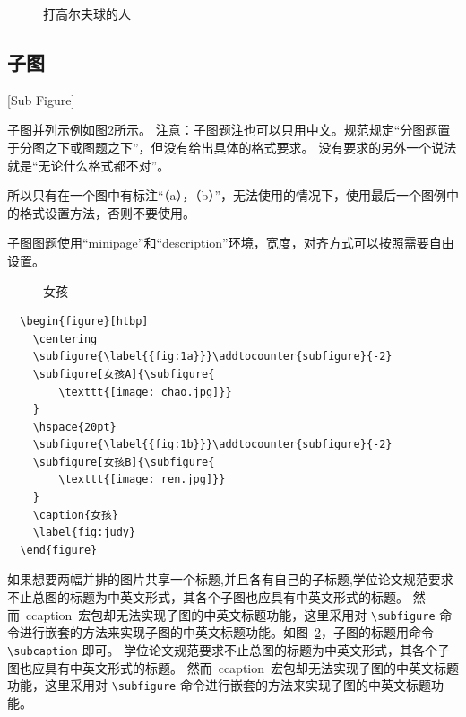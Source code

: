 \begin{figure}[htbp]
\begin{minipage}[t]{0.4\textwidth}
    \caption{打高尔夫球的人}
    \label{golfer6}
  \end{minipage}
\end{figure}

\subsection{子图}[Sub Figure]

子图并列示例如图\ref{fig:judy}所示。
注意：子图题注也可以只用中文。规范规定“分图题置于分图之下或图题之下”，但没有给出具体的格式要求。
没有要求的另外一个说法就是“无论什么格式都不对”。

所以只有在一个图中有标注“（a），（b）”，无法使用的情况下，使用最后一个图例中的格式设置方法，否则不要使用。

子图图题使用“minipage”和“description”环境，宽度，对齐方式可以按照需要自由设置。

\begin{figure}[htbp]
  \centering
  \addtocounter{subfigure}{-2}
  \hspace{20pt}
  \addtocounter{subfigure}{-2}
  \caption{女孩}
  \label{fig:judy}
\end{figure}

\begin{lstlisting}
  \begin{figure}[htbp]
    \centering
    \subfigure{\label{{fig:1a}}}\addtocounter{subfigure}{-2}
    \subfigure[女孩A]{\subfigure{
        \texttt{[image: chao.jpg]}}
    }
    \hspace{20pt}
    \subfigure{\label{{fig:1b}}}\addtocounter{subfigure}{-2}
    \subfigure[女孩B]{\subfigure{
        \texttt{[image: ren.jpg]}}
    }
    \caption{女孩}
    \label{fig:judy}
  \end{figure}
\end{lstlisting}


如果想要两幅并排的图片共享一个标题,并且各有自己的子标题,学位论文规范要求不止总图的标题为中英文形式，其各个子图也应具有中英文形式的标题。
然而~ccaption~宏包却无法实现子图的中英文标题功能，这里采用对 \verb|\subfigure| 命令进行嵌套的方法来实现子图的中英文标题功能。如图~\ref{fig:judy}，子图的标题用命令 \verb|\subcaption| 即可。
学位论文规范要求不止总图的标题为中英文形式，其各个子图也应具有中英文形式的标题。
然而~ccaption~宏包却无法实现子图的中英文标题功能，这里采用对 \verb|\subfigure| 命令进行嵌套的方法来实现子图的中英文标题功能。

